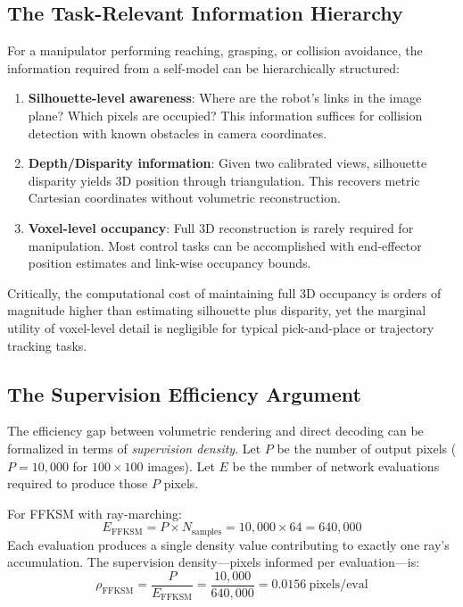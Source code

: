 \documentclass[12pt,a4paper,oneside]{report}
\begin{document}
\subsection{The Task-Relevant Information Hierarchy}
For a manipulator performing reaching, grasping, or collision avoidance, the information required from a self-model can be hierarchically structured:
\begin{enumerate}
    \item \textbf{Silhouette-level awareness}: Where are the robot's links in the image plane? Which pixels are occupied? This information suffices for collision detection with known obstacles in camera coordinates.
    \item \textbf{Depth/Disparity information}: Given two calibrated views, silhouette disparity yields 3D position through triangulation. This recovers metric Cartesian coordinates without volumetric reconstruction.
    \item \textbf{Voxel-level occupancy}: Full 3D reconstruction is rarely required for manipulation. Most control tasks can be accomplished with end-effector position estimates and link-wise occupancy bounds.
\end{enumerate}

Critically, the computational cost of maintaining full 3D occupancy is orders of magnitude higher than estimating silhouette plus disparity, yet the marginal utility of voxel-level detail is negligible for typical pick-and-place or trajectory tracking tasks.

\subsection{The Supervision Efficiency Argument}
The efficiency gap between volumetric rendering and direct decoding can be formalized in terms of \textit{supervision density}. Let $P$ be the number of output pixels ($P = 10,000$ for $100 \times 100$ images). Let $E$ be the number of network evaluations required to produce those $P$ pixels.

For FFKSM with ray-marching:
\begin{equation}
E_{\text{FFKSM}} = P \times N_{\text{samples}} = 10,000 \times 64 = 640,000
\end{equation}
Each evaluation produces a single density value contributing to exactly one ray's accumulation. The supervision density---pixels informed per evaluation---is:
\begin{equation}
\rho_{\text{FFKSM}} = \frac{P}{E_{\text{FFKSM}}} = \frac{10,000}{640,000} = 0.0156\ \text{pixels/eval}
\end{equation}
\end{document}
